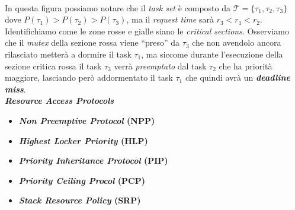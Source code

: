 \\
In questa figura possiamo notare che il \textit{task set} è composto da $\mathcal{T} = \{\tau_1, \tau_2, \tau_3\}$ dove $P(\tau_1) > P(\tau_2) > P(\tau_3)$, ma il \textit{request time} sarà $r_3 < r_1 < r_2$. Identifichiamo come le zone rosse e gialle siano le \textit{critical sections}. Osserviamo che il \textit{mutex} della sezione rossa viene ``preso'' da $\tau_3$ che non avendolo ancora rilasciato metterà a dormire il task $\tau_1$, ma siccome durante l'esecuzione della sezione critica rossa il task $\tau_3$ verrà \textit{preemptato} dal task $\tau_2$ che ha priorità maggiore, lasciando però addormentato il task $\tau_1$ che quindi avrà un \textbf{\textit{deadline miss}}. \\
\textbf{\textit{Resource Access Protocols}}
\begin{itemize}
    \item \textbf{\textit{Non Preemptive Protocol} (NPP)}
    \item \textbf{\textit{Highest Locker Priority} (HLP)}
    \item \textbf{\textit{Priority Inheritance Protocol} (PIP)}
    \item \textbf{\textit{Priority Ceiling Procol} (PCP)}
    \item \textbf{\textit{Stack Resource Policy} (SRP)}
\end{itemize}
\newpage
